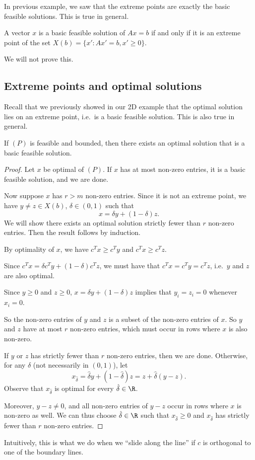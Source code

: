 \documentclass[a4paper]{article}
\begin{document}
In previous example, we saw that the extreme points are exactly the basic feasible solutions. This is true in general.
\begin{thm}
  A vector $x$ is a basic feasible solution of $Ax = b$ if and only if it is an extreme point of the set $X(b) = \{x': Ax' = b, x' \geq 0\}$.
\end{thm}
We will not prove this.

\subsection{Extreme points and optimal solutions}
Recall that we previously showed in our 2D example that the optimal solution lies on an extreme point, i.e.\ is a basic feasible solution. This is also true in general.

\begin{thm}
  If $(P)$ is feasible and bounded, then there exists an optimal solution that is a basic feasible solution.
\end{thm}

\begin{proof}
  Let $x$ be optimal of $(P)$. If $x$ has at most non-zero entries, it is a basic feasible solution, and we are done.

  Now suppose $x$ has $r > m$ non-zero entries. Since it is not an extreme point, we have $y\not= z\in X(b)$, $\delta \in (0, 1)$ such that
  \[
    x = \delta y + (1 - \delta) z.
  \]
  We will show there exists an optimal solution strictly fewer than $r$ non-zero entries. Then the result follows by induction.

  By optimality of $x$, we have $c^T x \geq c^T y$ and $c^T x \geq c^T z$.

  Since $c^T x = \delta c^T y + (1 - \delta)c^Tz$, we must have that $c^T x = c^T y = c^T z$, i.e.\ $y$ and $z$ are also optimal.

  Since $y \geq 0$ and $z \geq 0$, $x = \delta y + (1 - \delta) z$ implies that $y_i = z_i = 0$ whenever $x_i = 0$.

  So the non-zero entries of $y$ and $z$ is a subset of the non-zero entries of $x$. So $y$ and $z$ have at most $r$ non-zero entries, which must occur in rows where $x$ is also non-zero.

  If $y$ or $z$ has strictly fewer than $r$ non-zero entries, then we are done. Otherwise, for any $\hat{\delta}$ (not necessarily in $(0, 1)$), let
  \[
    x_{\hat{\delta}} = \hat{\delta} y + (1 - \hat{\delta}) z = z + \hat{\delta}(y - z).
  \]
  Observe that $x_{\hat{\delta}}$ is optimal for every $\hat\delta\in \R$.

  Moreover, $y - z \not= 0$, and all non-zero entries of $y - z$ occur in rows where $x$ is non-zero as well. We can thus choose $\hat\delta\in \R$ such that $x_{\hat{\delta}} \geq 0$ and $x_{\hat{\delta}}$ has strictly fewer than $r$ non-zero entries.
\end{proof}
Intuitively, this is what we do when we ``slide along the line'' if $c$ is orthogonal to one of the boundary lines.
\end{document}
